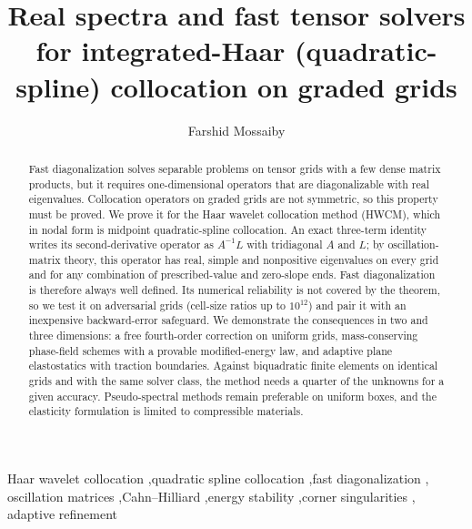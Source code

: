 \documentclass[preprint,12pt]{elsarticle}
\theoremstyle{remark}
\begin{document}
\begin{frontmatter}
\title{Real spectra and fast tensor solvers for integrated-Haar (quadratic-spline) collocation on graded grids}

\author[inst1]{Farshid Mossaiby}

\begin{abstract}
Fast diagonalization solves separable problems on tensor grids with a few dense matrix products, but it
requires one-dimensional operators that are diagonalizable with real eigenvalues. Collocation operators
on graded grids are not symmetric, so this property must be proved. We prove it for the Haar wavelet
collocation method (HWCM), which in nodal form is midpoint quadratic-spline collocation. An exact
three-term identity writes its second-derivative operator as $A^{-1}L$ with tridiagonal $A$ and $L$; by
oscillation-matrix theory, this operator has real, simple and nonpositive eigenvalues on every grid and
for any combination of prescribed-value and zero-slope ends. Fast diagonalization is therefore always
well defined. Its numerical reliability is not covered by the theorem, so we test it on adversarial grids
(cell-size ratios up to $10^{12}$) and pair it with an inexpensive backward-error safeguard. We demonstrate
the consequences in two and three dimensions: a free fourth-order correction on uniform grids,
mass-conserving phase-field schemes with a provable modified-energy law, and adaptive plane elastostatics
with traction boundaries. Against biquadratic finite elements on identical grids and with the same solver
class, the method needs a quarter of the unknowns for a given accuracy. Pseudo-spectral methods remain
preferable on uniform boxes, and the elasticity formulation is limited to compressible materials.
\end{abstract}


\begin{keyword}
Haar wavelet collocation \sep quadratic spline collocation \sep fast diagonalization \sep
oscillation matrices \sep Cahn--Hilliard \sep energy stability \sep corner singularities \sep
adaptive refinement
\end{keyword}
\end{frontmatter}

\end{document}
